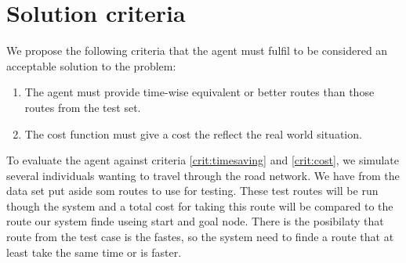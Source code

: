 \section{Solution criteria}
We propose the following criteria that the agent must fulfil to be considered an acceptable solution to the problem:

\begin{enumerate}
\item The agent must provide time-wise equivalent or better routes than those routes from the test set.\label{crit:timesaving}
\item The cost function must give a cost the reflect the real world situation.\label{crit:cost}
\end{enumerate}

To evaluate the agent against criteria \ref{crit:timesaving} and \ref{crit:cost}, we simulate several individuals wanting to travel through the road network. We have from the data set put aside som routes to use for testing. These test routes will be run though the system and a total cost for taking this route will be compared to the route our system finde useing start and goal node. There is the posibilaty that route from the test case is the fastes, so the system need to finde a route that at least take the same time or is faster.



